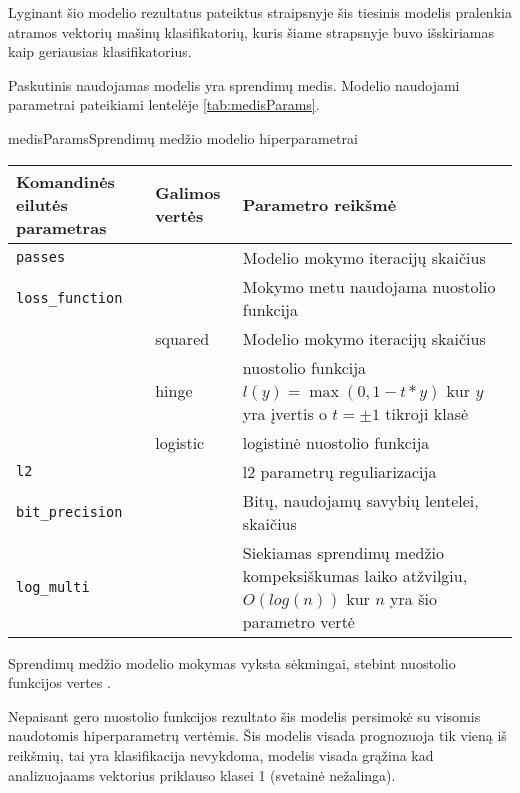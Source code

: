 
Lyginant šio modelio rezultatus pateiktus \cite{comp} straipsnyje šis tiesinis modelis pralenkia atramos vektorių mašinų klasifikatorių, kuris šiame strapsnyje buvo išskiriamas kaip geriausias klasifikatorius.


Paskutinis naudojamas modelis yra sprendimų medis. Modelio naudojami parametrai pateikiami lentelėje \vref{tab:medisParams}.


\begin{ktutable}{medisParams}{Sprendimų medžio modelio hiperparametrai}
    \begin{tabular}{| l | l | p{7cm}|}
    \hline
        Komandinės eilutės parametras & Galimos vertės & Parametro reikšmė\\ \hline
        \texttt{passes} &  & Modelio mokymo iteracijų skaičius \\ \hline
        \texttt{loss\_function} &          & Mokymo metu naudojama nuostolio funkcija \\
                               & squared  & Modelio mokymo iteracijų skaičius \\
                               & hinge    & nuostolio funkcija $l(y) = \max(0, 1 - t * y)$ kur $y$ yra įvertis o $t = \pm 1$ tikroji klasė  \\
                               & logistic & logistinė nuostolio funkcija \\ \hline
        \texttt{l2} & & l2 parametrų reguliarizacija \\ \hline
        \texttt{bit\_precision} & & Bitų, naudojamų savybių lentelei, skaičius\\ \hline
        \texttt{log\_multi} & & Siekiamas sprendimų medžio kompeksiškumas laiko atžvilgiu, $O(log(n))$ kur $n$ yra šio parametro vertė\\ \hline
    \end{tabular}
\end{ktutable}

Sprendimų medžio modelio mokymas vyksta sėkmingai, stebint nuostolio funkcijos vertes .


Nepaisant gero nuostolio funkcijos rezultato šis modelis persimokė su visomis naudotomis hiperparametrų vertėmis. Šis modelis visada prognozuoja tik vieną iš reikšmių, tai yra klasifikacija nevykdoma, modelis visada grąžina kad analizuojaams vektorius priklauso klasei 1 (svetainė nežalinga).

